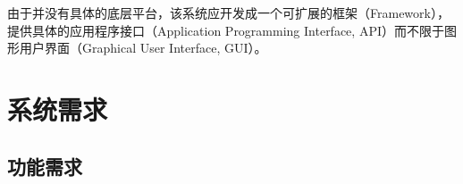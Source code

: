 \documentclass[cs4size,a4paper,nofonts]{ctexart}
\begin{document}
由于并没有具体的底层平台，该系统应开发成一个可扩展的框架（Framework），提供具体的应用程序接口（Application Programming Interface, API）而不限于图形用户界面（Graphical User Interface, GUI）。





\section{系统需求}

\subsection{功能需求}
\end{document}
